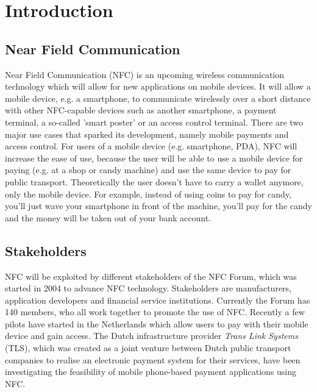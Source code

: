 \chapter{Introduction}


\section{Near Field Communication} %
Near Field Communication (NFC) is an upcoming wireless communication technology which will allow for new applications on mobile devices.
It will allow a mobile device, e.g. a smartphone, to communicate wirelessly over a short distance with other NFC-capable devices such as another smartphone, a payment terminal, a so-called 'smart poster' or an access control terminal.
There are two major use cases that sparked its development, namely mobile payments and access control.
For users of a mobile device (e.g. smartphone, PDA), NFC will increase the ease of use, because the user will be able to use a mobile device for paying (e.g. at a shop or candy machine) and use the same device to pay for public transport.
Theoretically the user doesn't have to carry a wallet anymore, only the mobile device.
For example, instead of using coins to pay for candy, you'll just wave your smartphone in front of the machine, you'll pay for the candy and the money will be taken out of your bank account. 


\section{Stakeholders}
NFC will be exploited by different stakeholders of the NFC Forum, which was started in 2004 to advance NFC technology.
Stakeholders are manufacturers, application developers and financial service institutions.
Currently the Forum has 140 members, who all work together to promote the use of NFC. 
Recently a few pilots have started in the Netherlands which allow users to pay with their mobile device and gain access.
The Dutch infrastructure provider \textit{Trans Link Systems} (TLS), which was created as a joint venture between Dutch public transport companies to realise an electronic payment system for their services, have been investigating the feasibility of mobile phone-based payment applications using NFC. %


